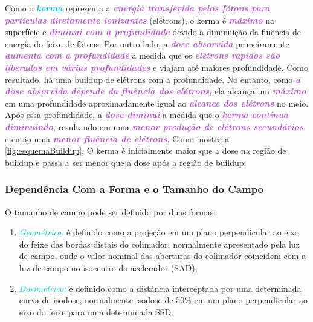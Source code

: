 \documentclass[11pt,a4paper]{article}
\begin{document}
	Como o \textcolor{DarkTurquoise}{\textbf{\textit{kerma}}} representa a \textcolor{MediumOrchid}{\textbf{\textit{energia transferida pelos fótons para partículas diretamente ionizantes}}} (elétrons), o kerma é \textcolor{MediumOrchid}{\textbf{\textit{máximo}}} na superfície e \textcolor{MediumOrchid}{\textbf{\textit{diminui com a profundidade}}} devido à diminuição da fluência de energia do feixe de fótons. Por outro lado, a \textcolor{MediumOrchid}{\textbf{\textit{dose absorvida}}} primeiramente \textcolor{MediumOrchid}{\textbf{\textit{aumenta com a profundidade}}} a medida que os \textcolor{MediumOrchid}{\textbf{\textit{elétrons rápidos são liberados em várias profundidades}}} e viajam até maiores profundidade. Como resultado, há uma buildup de elétrons com a profundidade. No entanto, como \textcolor{MediumOrchid}{\textbf{\textit{a dose absorvida depende da fluência dos elétrons}}}, ela alcança um \textcolor{MediumOrchid}{\textbf{\textit{máximo}}} em uma profundidade aproximadamente igual ao \textcolor{MediumOrchid}{\textbf{\textit{alcance dos elétrons}}} no meio. Após essa profundidade, a \textcolor{MediumOrchid}{\textbf{\textit{dose diminui}}} a medida que o \textcolor{MediumOrchid}{\textbf{\textit{kerma continua diminuindo}}}, resultando em uma \textcolor{MediumOrchid}{\textbf{\textit{menor produção de elétrons secundários}}} e então uma \textcolor{MediumOrchid}{\textbf{\textit{menor fluência de elétrons}}}. Como mostra a \ref{fig:esquemaBuildup}, O kerma é inicialmente maior que a dose na região de buildup e passa a ser menor que a dose após a região de buildup; 

	
\subsubsection*{Dependência Com a Forma e o Tamanho do Campo}

	O tamanho de campo pode ser definido por duas formas:

	\begin{enumerate}
		\item \textit{\textcolor{DarkTurquoise}{Geométrico:}} é definido como a projeção em um plano perpendicular ao eixo do feixe das bordas distais do colimador, normalmente apresentado pela luz de campo, onde o valor nominal das aberturas do colimador coincidem com a luz de campo no isocentro do acelerador (SAD);
		\item \textit{\textcolor{DarkTurquoise}{Dosimétrico:}} é definido como a distância interceptada por uma determinada curva de isodose, normalmente isodose de 50\% em um plano perpendicular ao eixo do feixe para uma determinada SSD. 
	\end{enumerate}
\end{document}
